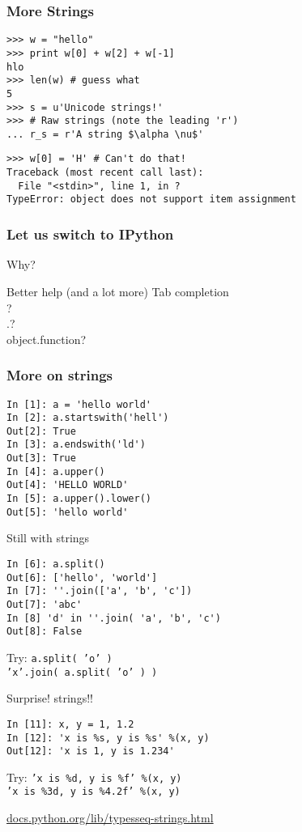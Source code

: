 \documentclass[14pt,compress]{beamer}
\begin{document}
\begin{frame}[fragile]
  \frametitle{More Strings}
  \vspace*{-0.2in}
  \begin{lstlisting}
>>> w = "hello"    
>>> print w[0] + w[2] + w[-1]
hlo
>>> len(w) # guess what
5
>>> s = u'Unicode strings!'
>>> # Raw strings (note the leading 'r')
... r_s = r'A string $\alpha \nu$'
  \end{lstlisting}
\pause
  \begin{lstlisting}
>>> w[0] = 'H' # Can't do that!
Traceback (most recent call last):
  File "<stdin>", line 1, in ?
TypeError: object does not support item assignment
  \end{lstlisting}
\end{frame}

\begin{frame}
  \frametitle{Let us switch to IPython}
  Why?
  \begin{block}
    {Better help (and a lot more)}
    Tab completion\\
    ?\\
    .?\\
    object.function?
  \end{block}
\end{frame}

\begin{frame}[fragile]
  \frametitle{More on strings}
  \begin{lstlisting}
In [1]: a = 'hello world'
In [2]: a.startswith('hell')
Out[2]: True
In [3]: a.endswith('ld')
Out[3]: True
In [4]: a.upper()
Out[4]: 'HELLO WORLD'
In [5]: a.upper().lower()
Out[5]: 'hello world'
  \end{lstlisting}
\end{frame}

\begin{frame}[fragile]{Still with strings}
  \begin{lstlisting}
In [6]: a.split()
Out[6]: ['hello', 'world']
In [7]: ''.join(['a', 'b', 'c'])
Out[7]: 'abc'
In [8] 'd' in ''.join( 'a', 'b', 'c')
Out[8]: False
  \end{lstlisting}
  \begin{block}{Try:}
    \texttt{a.split( 'o' )}\\
    \texttt{'x'.join( a.split( 'o' ) )}
  \end{block}
\end{frame}

\begin{frame}[fragile]{Surprise! strings!!}
  \begin{lstlisting}
In [11]: x, y = 1, 1.2
In [12]: 'x is %s, y is %s' %(x, y)
Out[12]: 'x is 1, y is 1.234'
  \end{lstlisting}
  \begin{block}{Try:}
    \texttt{'x is \%d, y is \%f' \%(x, y) }\\
    \texttt{'x is \%3d, y is \%4.2f' \%(x, y) }
  \end{block}
  \small
\url{docs.python.org/lib/typesseq-strings.html}\\
\end{frame}
\end{document}
